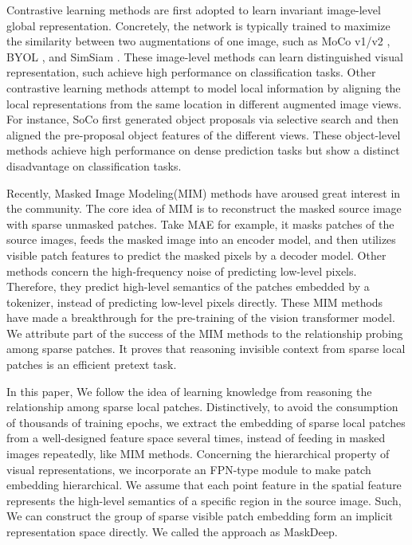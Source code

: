 \documentclass[10pt,twocolumn,letterpaper]{article}
\begin{document}
Contrastive learning methods are first adopted to learn invariant image-level global representation. Concretely, the network is typically trained to maximize the similarity between two augmentations of one image, such as MoCo v1/v2 \cite{he2020momentum,chen2020improved}, BYOL \cite{grill2020bootstrap}, and SimSiam \cite{simsiam}. These image-level methods can learn distinguished visual representation, such achieve high performance on classification tasks.
Other contrastive learning methods\cite{densecl,insloc,wei2021aligning} attempt to model local information by aligning the local representations from the same location in different augmented image views. For instance, SoCo\cite{wei2021aligning} first generated object proposals via selective search \cite{ren2015faster} and then aligned the pre-proposal object features of the different views. These object-level methods achieve high performance on dense prediction tasks but show a distinct disadvantage on classification tasks. 

Recently, Masked Image Modeling(MIM)\cite{he2022masked,bao2021beit,xie2022simmim,zhou2021ibot,baevski2022data2vec} methods have aroused great interest in the community. 
The core idea of MIM is to reconstruct the masked source image with sparse unmasked patches. Take MAE\cite{he2022masked} for example, it masks patches of the source images, feeds the masked image into an encoder model, and then utilizes visible patch features to predict the masked pixels by a decoder model. Other methods\cite{bao2021beit,xie2022simmim} concern the high-frequency noise of predicting low-level pixels. Therefore, they predict high-level semantics of the patches embedded by a tokenizer, instead of predicting low-level pixels directly. These MIM methods have made a breakthrough for the pre-training of the vision transformer model. We attribute part of the success of the MIM methods to the relationship probing among sparse patches. It proves that reasoning invisible context from sparse local patches is an efficient pretext task. 


In this paper, We follow the idea of learning knowledge from reasoning the relationship among sparse local patches. Distinctively, to avoid the consumption of thousands of training epochs, we extract the embedding of sparse local patches from a well-designed feature space several times, instead of feeding in masked images repeatedly, like MIM methods. Concerning the hierarchical property of visual representations, we incorporate an FPN-type module to make patch embedding hierarchical. We assume that each point feature in the spatial feature represents the high-level semantics of a specific region in the source image. Such, We can construct the group of sparse visible patch embedding form an implicit representation space directly. We called the approach as MaskDeep. 
\end{document}
